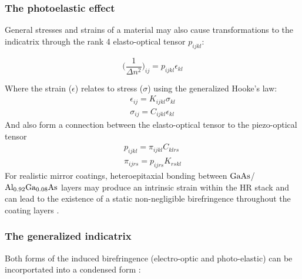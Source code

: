 \subsubsection{The photoelastic effect}

General stresses and strains of a material may also cause transformations to the indicatrix through the rank 4 elasto-optical tensor $p_{i j k l}$:

\begin{equation}
 \bigg( \frac{1}{\Delta n^2} \bigg)_{ij} = p_{ijkl} \epsilon_{kl}
\end{equation}

\noindent Where the strain ({\boldmath$\epsilon$}) relates to stress ({\boldmath$\sigma$}) using the generalized Hooke's law: 
\begin{equation}\label{eq:gen_hookeslaw} 
 \begin{split}
	 \epsilon_{ij} = K_{ijkl} \sigma_{kl}
	 \\
	 \sigma_{ij} = C_{ijkl} \epsilon_{kl}
 \end{split}
\end{equation}
And also form a connection between the elasto-optical tensor to the piezo-optical tensor
\begin{equation}\label{eq:indicgen_elasto_optical}
 \begin{split}
	p_{ijkl} = \pi_{ijkl} C_{klrs}
	\\
	\pi_{ijrs} = p_{ijrs} K_{rskl}
 \end{split}
\end{equation}
For realistic mirror coatings, heteroepitaxial bonding between $\mathrm{GaAs}$/$\mathrm{Al_{0.92}Ga_{0.08}As}$ layers may produce an intrinsic strain within the HR stack and can lead to the existence of a static non-negligible birefringence throughout the coating layers \cite{Cole:16}.

\subsubsection{The generalized indicatrix}
Both forms of the induced birefringence (electro-optic and photo-elastic) can be incorportated into a condensed form \cite{nye}:

